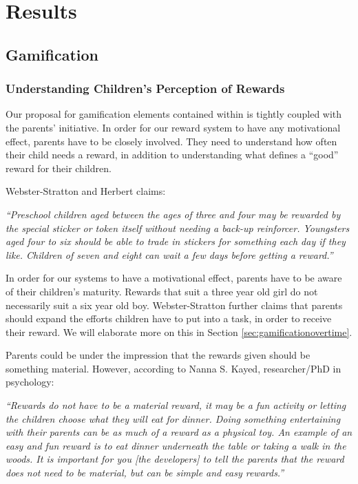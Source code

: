 \chapter{Results}
\label{chp:results}

\section{Gamification}
\label{sec:gamificationresults}

\subsection{Understanding Children's Perception of Rewards}
\label{sec:understandingchildrensperceptionofrewards}

Our proposal for gamification elements contained within \app{} is tightly coupled with the parents' initiative. In order for our reward system to have any motivational effect, parents have to be closely involved. They need to understand how often their child needs a reward, in addition to understanding what defines a ``good'' reward for their children. 

Webster-Stratton and Herbert claims:

\textit{``Preschool children aged between the ages of three and four may be rewarded by the special sticker or token itself without needing a back-up reinforcer. Youngsters aged four to six should be able to trade in stickers for something each day if they like. Children of seven and eight can wait a few days before getting a reward.''}\cite{webster1994troubled}

In order for our systems to have a motivational effect, parents have to be aware of their children's maturity. Rewards that suit a three year old girl do not necessarily suit a six year old boy. Webster-Stratton further claims that parents should expand the efforts children have to put into a task, in order to receive their reward. We will elaborate more on this in Section \ref{sec:gamificationovertime}. 

Parents could be under the impression that the rewards given should be something material. However, according to Nanna S. Kayed, researcher/PhD in psychology: 

\textit{``Rewards do not have to be a material reward, it may be a fun activity or letting the children choose what they will eat for dinner. Doing something entertaining with their parents can be as much of a reward as a physical toy. An example of an easy and fun reward is to eat dinner underneath the table or taking a walk in the woods. It is important for you [the developers] to tell the parents that the reward does not need to be material, but can be simple and easy rewards.''}

